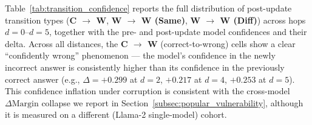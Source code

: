 Table~\ref{tab:transition_confidence} reports the full distribution of post-update transition types (\textbf{C $\to$ W}, \textbf{W $\to$ W (Same)}, \textbf{W $\to$ W (Diff)}) across hops $d{=}0$--$d{=}5$, together with the pre- and post-update model confidences and their delta. Across all distances, the \textbf{C $\to$ W} (correct-to-wrong) cells show a clear ``confidently wrong'' phenomenon — the model's confidence in the newly incorrect answer is consistently higher than its confidence in the previously correct answer (e.g., $\Delta = +0.299$ at $d{=}2$, $+0.217$ at $d{=}4$, $+0.253$ at $d{=}5$). This confidence inflation under corruption is consistent with the cross-model $\Delta\mathrm{Margin}$ collapse we report in Section~\ref{subsec:popular_vulnerability}, although it is measured on a different (Llama-2 single-model) cohort.









